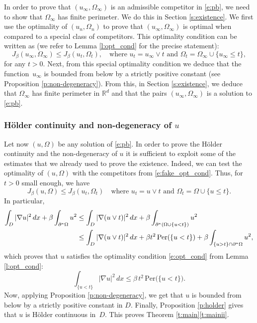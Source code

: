 \documentclass[11pt]{article}
\numberwithin{equation}{section}
\newcommand{\Per}{\mathrm{Per}}
\theoremstyle{plain}
\theoremstyle{definition}
\def\R{\mathbb{R}}
\begin{document}
In order to prove that $(u_\infty,\Omega_\infty)$ is an admissible competitor in \eqref{e:pb}, we need to show that $\Omega_\infty$ has finite perimeter. We do this in Section \ref{s:existence}.
We first use the optimality of $(u_n,\Omega_n)$ to prove that $(u_\infty,\Omega_\infty)$ is optimal when compared to a special class of competitors. This optimality condition can be written as (we refer to Lemma \ref{l:opt_cond} for the precise statement):
\begin{equation}\label{e:fake_opt_cond}
J_\beta(u_\infty,\Omega_\infty)\le J_\beta(u_t,\Omega_t),\quad\text{where $u_t=u_\infty\vee t$ and $\Omega_t=\Omega_\infty\cup \{u_\infty\le t\}$},
\end{equation}
for any $t>0$. Next, from this special optimality condition we deduce that the function~$u_\infty$ is bounded from below by a strictly positive constant (see Proposition \ref{p:non-degeneracy}). From this, in Section \ref{s:existence}, we deduce that $\Omega_\infty$ has finite perimeter in $\R^d$ and that the pairs $(u_\infty,\Omega_\infty)$ is a solution to \eqref{e:pb}.

\subsubsection{Hölder continuity and non-degeneracy of $u$} Let now $(u,\Omega)$ be any solution of \eqref{e:pb}. In order to prove the Hölder continuity and the non-degeneracy of $u$ it is sufficient to exploit some of the estimates that we already used to prove the existence. Indeed, we can test the optimality of $(u,\Omega)$ with the competitors from \eqref{e:fake_opt_cond}. Thus, for $t>0$ small enough, we have
\begin{equation}%
J_\beta(u,\Omega)\le J_\beta(u_t,\Omega_t)\quad\text{where $u_t=u\vee t$ and $\Omega_t=\Omega\cup \{u\le t\}$}.
\end{equation}
In particular,
\begin{align}
\int_{D}|\nabla u|^2\,dx+\beta\int_{\partial^\ast\Omega}u^2\notag&\le \int_{D}|\nabla (u\vee t)|^2\,dx+\beta\int_{\partial^\ast(\Omega\cup\{u<t\})}u^2\notag\\
&\le \int_{D}|\nabla (u\vee t)|^2\,dx+\beta t^2\, \Per(\{u<t\})+\beta\int_{\{u> t\}\cap \partial^\ast\Omega}u^2,\notag
\end{align}
which proves that $u$ satisfies the optimality condition \eqref{e:opt_cond} from Lemma \ref{l:opt_cond}:
\begin{equation}%
\int_{\{u<t\}}|\nabla u|^2\,dx\le \beta\, t^2\, \Per\big(\{u<t\}\big).
\end{equation}
Now, applying Proposition \ref{p:non-degeneracy}, we get that $u$ is bounded from below by a strictly positive constant in $D$. Finally, Proposition \ref{p:holder} gives that $u$ is Hölder continuous in~$D$. This proves Theorem \ref{t:main}\eqref{t:mainii}.
\end{document}
